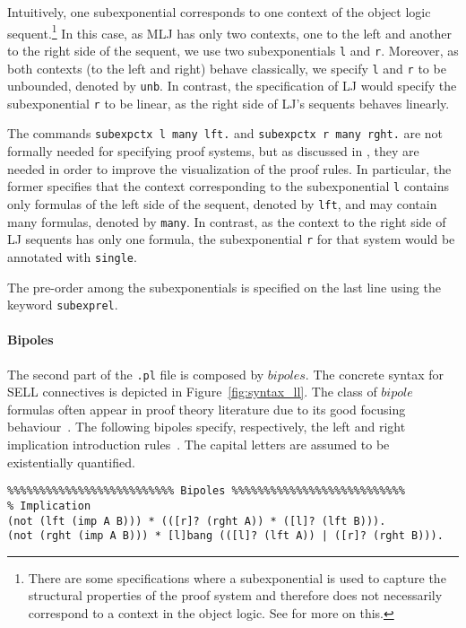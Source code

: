 \documentclass{llncs}
\begin{document}
Intuitively, one subexponential corresponds to one context of the object logic sequent.\footnote{There are 
some specifications where a subexponential is used to capture the structural properties of the proof 
system and therefore does not necessarily correspond to a context in the object logic. See \cite{nigam.jlc}
for more on this.}
In this case, as MLJ has only two
contexts, one to the left and another to the right side of the sequent, we use two subexponentials
\texttt{l} and \texttt{r}. Moreover, as both contexts (to the left and right) behave classically, 
we specify \texttt{l} and \texttt{r} to be unbounded, denoted by \texttt{unb}. In contrast, 
the specification of LJ would specify the subexponential \texttt{r} to be linear, as the right side of LJ's 
sequents behaves linearly.

The commands \texttt{subexpctx l many lft.} and  \texttt{subexpctx r many rght.} are not formally needed for specifying proof systems, 
but as discussed 
in \cite{nigam14ebl}, they are needed in order to improve the visualization of the proof rules. 
In particular, the former specifies that the context corresponding to the subexponential \texttt{l} contains 
only formulas of the left side of the sequent, denoted by \texttt{lft}, and may contain many formulas, denoted 
by \texttt{many}. In contrast, as the context to the right side of LJ sequents has only one formula, the 
subexponential \texttt{r} for that system would be annotated with \texttt{single}.

The pre-order among the subexponentials is specified on the last line using the
keyword \texttt{subexprel}.

\paragraph{Bipoles}
%
The second part of the \texttt{.pl} file is composed by $bipoles$. The concrete syntax for SELL connectives
is depicted in Figure~\ref{fig:syntax_ll}. The class of $bipole$ formulas often
appear in proof theory literature due to its good focusing
behaviour~\cite{andreoli}. The following bipoles specify, 
respectively, the left and right implication introduction rules~\cite{nigam.jlc}. The capital 
letters are assumed to be existentially quantified.
%
{\scriptsize
\begin{verbatim}
%%%%%%%%%%%%%%%%%%%%%%%%%% Bipoles %%%%%%%%%%%%%%%%%%%%%%%%%%%
% Implication
(not (lft (imp A B))) * (([r]? (rght A)) * ([l]? (lft B))).
(not (rght (imp A B))) * [l]bang (([l]? (lft A)) | ([r]? (rght B))).
\end{verbatim}
}
\end{document}
